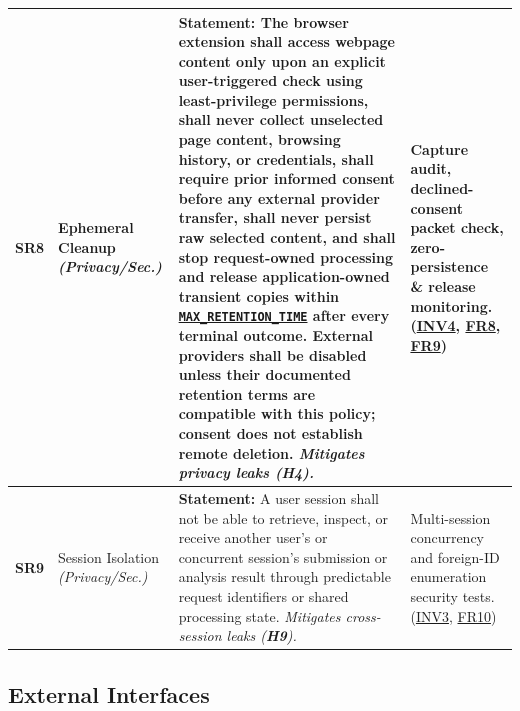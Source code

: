 \documentclass[11pt]{article}
\newcommand{\MaxRetentionTime}{\hyperref[const:MAX_RETENTION_TIME]{\texttt{MAX\_\allowbreak{}RETENTION\_\allowbreak{}TIME}}}
\begin{document}
{\begin{tabularx}{\textwidth}{P{1.1cm} P{2.35cm} Y P{3.5cm}}
\label{SR8}\textbf{SR8} & Ephemeral Cleanup \textit{(Privacy/Sec.)} &
\textbf{Statement:} The browser extension shall access webpage content only upon an explicit user-triggered check using least-privilege permissions, shall never collect unselected page content, browsing history, or credentials, shall require prior informed consent before any external provider transfer, shall never persist raw selected content, and shall stop request-owned processing and release application-owned transient copies within \MaxRetentionTime{} after every terminal outcome. External providers shall be disabled unless their documented retention terms are compatible with this policy; consent does not establish remote deletion.\newline
\textit{Mitigates privacy leaks (\textbf{H4}).} &
Capture audit, declined-consent packet check, zero-persistence \& release monitoring. (\hyperref[INV4]{INV4}, \hyperref[FR8]{FR8}, \hyperref[FR9]{FR9})\\
\midrule

\label{SR9}\textbf{SR9} & Session Isolation \textit{(Privacy/Sec.)} &
\textbf{Statement:} A user session shall not be able to retrieve, inspect, or receive another user's or concurrent session's submission or analysis result through predictable request identifiers or shared processing state.\newline
\textit{Mitigates cross-session leaks (\textbf{H9}).} &
Multi-session concurrency and foreign-ID enumeration security tests. (\hyperref[INV3]{INV3}, \hyperref[FR10]{FR10})\\
\end{tabularx}
}

\subsection{External Interfaces}\label{subsec:interfaces}
\end{document}
